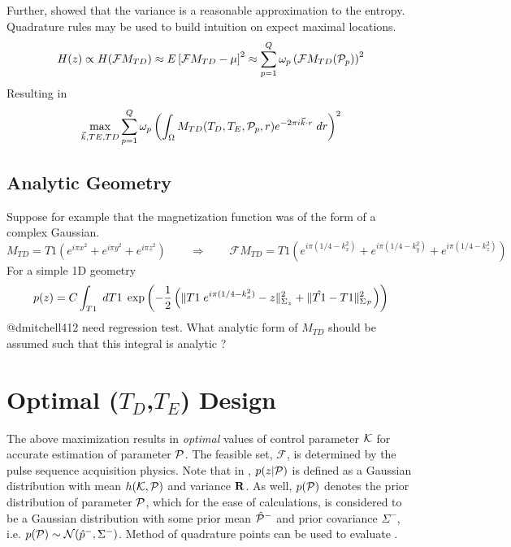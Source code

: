 \documentclass{article}         %
\theoremstyle{definition}
\theoremstyle{remark}
\begin{document}
Further, \cite{madankan2015accelerated} showed that the variance is a reasonable
approximation to the entropy. Quadrature rules may be used to build
intuition on expect maximal locations.
\[
 H(z)   \propto H(\mathcal{F}M_{TD} )
   \approx E\left[\mathcal{F}M_{TD} - \mu\right]^2
   \approx \sum_{p=1}^Q \omega_p \left( \mathcal{F}M_{TD}(\mathcal{P}_p) \right)^2
\]
Resulting in 
\[
   \max_{\vec{k},TE,TD} \sum_{p=1}^Q \omega_p \left(
     \int_\Omega M_{TD}(T_D,T_E,\mathcal{P}_p,r)
          e^{-2  \pi i \vec{k}  \cdot r } \; dr
     \right)^2
\]

\subsection{Analytic Geometry}

Suppose for example that the magnetization function was of the form of a complex Gaussian.
\[
   M_{TD} = T1 \left( e^{i \pi x^2}
                    + e^{i \pi y^2}
                    + e^{i \pi z^2}
               \right)
  \qquad
  \Rightarrow
  \qquad
  \mathcal{F} M_{TD} =
            T1 \left(  e^{i \pi (1/4 - k_x^2)}
                     + e^{i \pi (1/4 - k_y^2)}
                     + e^{i \pi (1/4 - k_z^2)}
               \right)
\]
For a simple 1D geometry
\[
    p(z) = 
         C \int_{T1}
            \; dT1 \;   
              \exp\left( - \frac{1}{2} \left(
                     \|T1 \; e^{i \pi (1/4 - k_x^2)}  - z \|^2_{\Sigma_z}
                   + \|\hat{T1}  - T1 \|^2_{\Sigma_{\mathcal{P}}}
                  \right)              \right)
\]
{\color{red} @dmitchell412 need regression test.  What analytic form of
$M_{TD}$ should be assumed such that this integral is analytic ?  }

\section{Optimal ($T_D$,$T_E$) Design}\label{oed}

The above maximization results in \textit{optimal} values of control parameter
$\mathcal{K}$ for accurate estimation of parameter $\mathcal{P}$. 
The feasible set, $\mathcal{F}$, is determined by the pulse sequence acquisition physics.
Note that in ,
$p(z|\mathcal{P})$ is defined as a Gaussian distribution with mean $h(\mathcal{K},\mathcal{P})$ and
variance $\mathbf{R}$. As well, $p(\mathcal{P})$ denotes the prior distribution of parameter
$\mathcal{P}$, which for the ease of calculations, is considered to be a Gaussian
distribution with some prior mean $\hat{\mathcal{P}}^-$ and prior covariance $\Sigma^-$,
i.e. $p(\mathcal{P})\sim \mathcal{N}(\hat{p}^-,\Sigma^-)$. Method of quadrature points
can be used to evaluate . 
\end{document}
